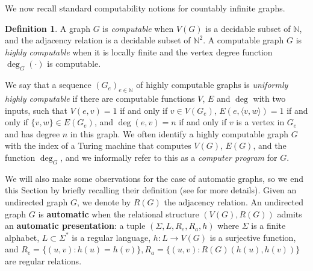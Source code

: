 \documentclass[10pt,A4]{amsart}
\theoremstyle{definition}
\newtheorem{defn}[thm]{Definition}
\theoremstyle{definition}
\newcommand{\N}{\mathbb{N}}
\begin{document}
We now recall standard computability notions for countably infinite graphs.
\begin{defn}
    A graph $G$ is \emph{computable} when $V(G)$ is a decidable subset of $\N$, and the adjacency relation is a decidable subset of $\N^2$. A computable graph $G$ is \emph{highly computable} when it is locally finite  and the vertex degree function $\deg_G(\cdot)$ is computable. 
\end{defn}

    We say that a sequence $(G_e)_{e \in \N}$ of highly computable graphs is \emph{uniformly highly computable} if there are computable functions $V$, $E$ and $\deg$ with two inputs, such that $V(e,v)=1$ if and only if $v \in V(G_e)$, $E(e,\langle v,w\rangle)=1$ if and only if $\{v,w\} \in E(G_e)$,  and 
    $\deg(e,v)=n$ if and only if $v$ is a vertex in $G_e$ and has degree $n$ in this graph.  We often identify a highly computable graph $G$ with the index of a Turing machine that computes $V(G)$, $E(G)$, and the function $\deg_G$, and we informally refer to this as a \emph{computer program} for $G$. %
    
    We will also make some observations for the case of automatic graphs, so we end this Section by briefly recalling their definition (see \cite{khoussainov_automatic_1995} for more details). Given an undirected graph $G$, we denote by $R(G)$ the adjacency relation. An undirected graph $G$ is \textbf{automatic} when the relational structure $(V(G),R(G))$ admits an \textbf{automatic presentation}: a tuple $(\Sigma,L,R_e,R_a,h)$ where $\Sigma$ is a finite alphabet, $L\subset \Sigma^\ast$ is a regular language, $h\colon L\to V(G)$ is a surjective function, and $R_e=\{(u,v) : h(u)=h(v)\}, R_a=\{(u,v) : R(G)(h(u),h(v))\}$ are regular relations. 
\end{document}
